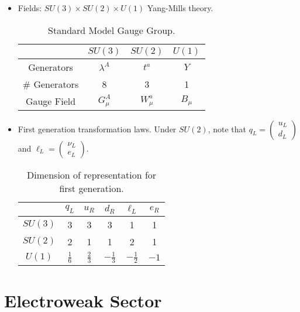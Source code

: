 \documentclass[11pt, oneside]{article}   	%
\theoremstyle{definition}
\begin{document}
\begin{itemize}
	
	\item Fields: $SU(3)\times SU(2)\times U(1)$ Yang-Mills theory.
	\begin{table}[H]
		\centering
		\begin{tabular}{| c | c | c | c | }
		\hline
		& $SU(3)$ & $SU(2)$ & $U(1)$ \\
		\hline
		Generators & $\lambda^A$ & $t^a$ & $Y$ \\
		\hline
		\# Generators & 8 & 3 & 1 \\
		\hline
		Gauge Field & $G_\mu^A$ & $W_\mu^a$ & $B_\mu$ \\
		\hline
		\end{tabular}
		\caption{Standard Model Gauge Group.}
	\end{table}
	
	\item First generation transformation laws. Under $SU(2)$, note that $q_L = \begin{pmatrix}u_L \\ d_L \end{pmatrix}$ and 
	$\ell_L = \begin{pmatrix}\nu_L \\ e_L \end{pmatrix}$.
	\begin{table}[H]
		\centering
		\begin{tabular}{ | c | c | c | c | c | c | }
			\hline
			& $q_L$ & $u_R$ & $d_R$ & $\ell_L$ & $e_R$ \\
			\hline
			$SU(3)$ & 3 & 3 & 3 & 1 & 1 \\
			\hline
			$SU(2)$ & 2 & 1 & 1 & 2 & 1 \\
			\hline
			$U(1)$ & $\frac{1}{6}$ & $\frac{2}{3}$ & $-\frac{1}{3}$ & $-\frac{1}{2}$ & $-1$ \\
			\hline
		\end{tabular}
		\caption{Dimension of representation for first generation.}
	\end{table}
	
\end{itemize}

\section*{Electroweak Sector}
\end{document}
